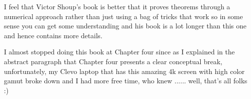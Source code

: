 \documentclass[aps,preprint,preprintnumbers,nofootinbib,showpacs,prd]{revtex4-1}
\begin{document}
I feel that Victor Shoup's book is better that it proves theorems through a numerical approach rather than just using a bag of tricks that work so in some sense you can get some understanding and his book is a lot longer than this one and hence contains more details.

I almost stopped doing this book at Chapter four since as I explained in the abstract paragraph that Chapter four presents a clear conceptual break, unfortunately, my Clevo laptop that has this amazing 4k screen with high color gamut broke down and I had more free time, who knew ...... well, that's all folks :)
\end{document}
